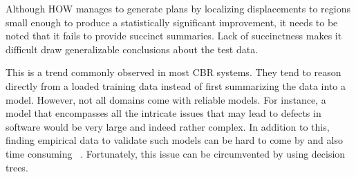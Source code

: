 \documentclass{sig-alternate}
\begin{document}
Although HOW manages to generate plans by localizing displacements to regions small enough to produce a statistically significant improvement, it needs to be noted that it fails to provide succinct summaries. Lack of succinctness makes it difficult draw generalizable conclusions about the test data. 

This is a trend commonly observed in most CBR systems. They tend to reason directly from a loaded training data instead of first summarizing the data into a model. However, not all domains come with reliable models. For instance, a model that encompasses all the intricate issues that may lead to defects in software would be very large and indeed rather complex. In addition to this, finding empirical data to validate such models can be hard to come by and also time consuming ~\cite{me09i,me09j}. Fortunately, this issue can be circumvented by using decision trees. 
 
\end{document}
